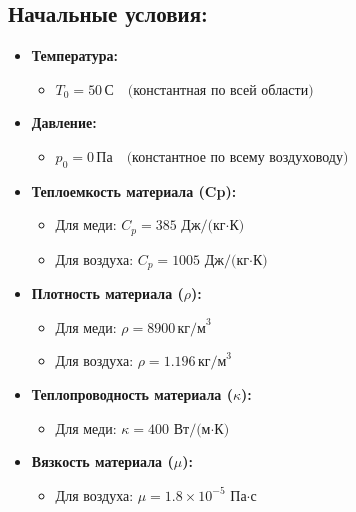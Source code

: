 \documentclass[a4paper,12pt]{extreport}
\numberwithin{equation}{chapter}
\begin{document}
\subsection{Начальные условия:}

\begin{itemize}
	\item \textbf{Температура:}
	      \begin{itemize}
		      \item $T_0 = 50 \, \text{С} \quad \text{(константная по всей области)}$
	      \end{itemize}
	      
	\item \textbf{Давление:}
	      \begin{itemize}
		      \item $p_0 = 0 \, \text{Па} \quad \text{(константное по всему воздуховоду)}$
	      \end{itemize}
	      
	\item \textbf{Теплоемкость материала (Cp):}
	      \begin{itemize}
		      \item Для меди: $C_p = 385 \, \text{Дж/(кг$\cdot$К)}$
		      \item Для воздуха: $C_p = 1005 \, \text{Дж/(кг$\cdot$К)}$
	      \end{itemize}
	      
	\item \textbf{Плотность материала ($\rho$):}
	      \begin{itemize}
		      \item Для меди: $\rho = 8900 \, \text{кг/м}^3$
		      \item Для воздуха: $\rho = 1.196 \, \text{кг/м}^3$
	      \end{itemize}
	      
	\item \textbf{Теплопроводность материала ($\kappa$):}
	      \begin{itemize}
		      \item Для меди: $\kappa = 400 \, \text{Вт/(м$\cdot$К)}$
	      \end{itemize}
	      
	\item \textbf{Вязкость материала ($\mu$):}
	      \begin{itemize}
		      \item Для воздуха: $\mu = 1.8 \times 10^{-5} \, \text{Па$\cdot$с}$
	      \end{itemize}
	      

\end{itemize}
\end{document}
